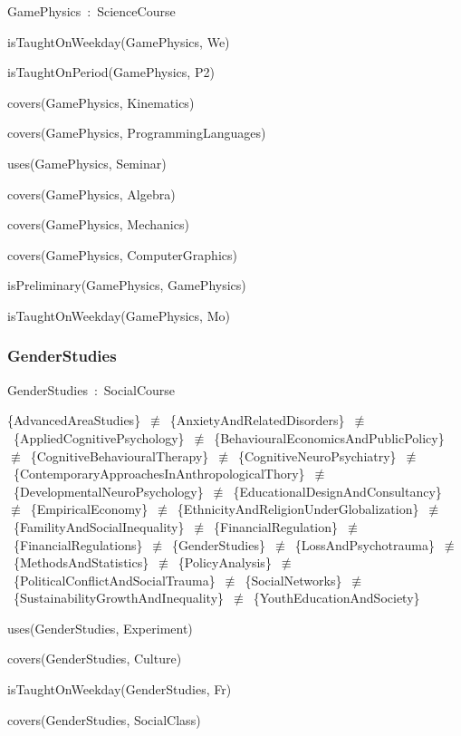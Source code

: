 \documentclass{article}
\begin{document}
GamePhysics~:~ScienceCourse

isTaughtOnWeekday(GamePhysics, We)

isTaughtOnPeriod(GamePhysics, P2)

covers(GamePhysics, Kinematics)

covers(GamePhysics, ProgrammingLanguages)

uses(GamePhysics, Seminar)

covers(GamePhysics, Algebra)

covers(GamePhysics, Mechanics)

covers(GamePhysics, ComputerGraphics)

isPreliminary(GamePhysics, GamePhysics)

isTaughtOnWeekday(GamePhysics, Mo)

\subsubsection*{GenderStudies}

GenderStudies~:~SocialCourse

\{AdvancedAreaStudies\}~\ensuremath{\not\equiv}~\{AnxietyAndRelatedDisorders\}~\ensuremath{\not\equiv}~\{AppliedCognitivePsychology\}~\ensuremath{\not\equiv}~\{BehaviouralEconomicsAndPublicPolicy\}~\ensuremath{\not\equiv}~\{CognitiveBehaviouralTherapy\}~\ensuremath{\not\equiv}~\{CognitiveNeuroPsychiatry\}~\ensuremath{\not\equiv}~\{ContemporaryApproachesInAnthropologicalThory\}~\ensuremath{\not\equiv}~\{DevelopmentalNeuroPsychology\}~\ensuremath{\not\equiv}~\{EducationalDesignAndConsultancy\}~\ensuremath{\not\equiv}~\{EmpiricalEconomy\}~\ensuremath{\not\equiv}~\{EthnicityAndReligionUnderGlobalization\}~\ensuremath{\not\equiv}~\{FamilityAndSocialInequality\}~\ensuremath{\not\equiv}~\{FinancialRegulation\}~\ensuremath{\not\equiv}~\{FinancialRegulations\}~\ensuremath{\not\equiv}~\{GenderStudies\}~\ensuremath{\not\equiv}~\{LossAndPsychotrauma\}~\ensuremath{\not\equiv}~\{MethodsAndStatistics\}~\ensuremath{\not\equiv}~\{PolicyAnalysis\}~\ensuremath{\not\equiv}~\{PoliticalConflictAndSocialTrauma\}~\ensuremath{\not\equiv}~\{SocialNetworks\}~\ensuremath{\not\equiv}~\{SustainabilityGrowthAndInequality\}~\ensuremath{\not\equiv}~\{YouthEducationAndSociety\}

uses(GenderStudies, Experiment)

covers(GenderStudies, Culture)

isTaughtOnWeekday(GenderStudies, Fr)

covers(GenderStudies, SocialClass)
\end{document}
